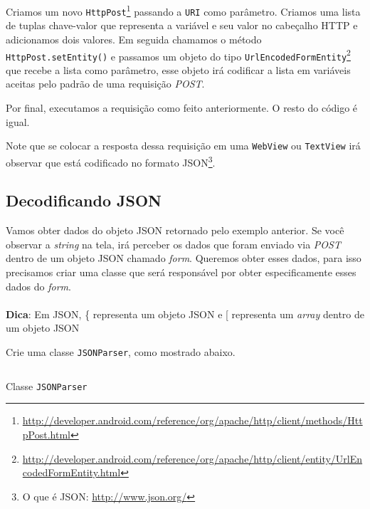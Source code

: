 \documentclass[a4paper,12pt,brazil,oneside]{book}
\begin{document}
		Criamos um novo \texttt{HttpPost}\footnote{\href{http://developer.android.com/reference/org/apache/http/client/methods/HttpPost.html}{http://developer.android.com/reference/org/apache/http/client/methods/HttpPost.html}} passando a \texttt{URI} como parâmetro. Criamos uma lista de tuplas chave-valor que representa a variável e seu valor no cabeçalho HTTP e adicionamos dois valores. Em seguida chamamos o método \texttt{HttpPost.setEntity()} e passamos um objeto do tipo \texttt{UrlEncodedFormEntity}\footnote{\href{http://developer.android.com/reference/org/apache/http/client/entity/UrlEncodedFormEntity.html}{http://developer.android.com/reference/org/apache/http/client/entity/UrlEncodedFormEntity.html}} que recebe a lista como parâmetro, esse objeto irá codificar a lista em variáveis aceitas pelo padrão de uma requisição \emph{POST}.

		Por final, executamos a requisição como feito anteriormente. O resto do código é igual.

 		Note que se colocar a resposta dessa requisição em uma \texttt{WebView} ou \texttt{TextView} irá observar que está codificado no formato JSON\footnote{O que é JSON: \href{http://www.json.org/}{http://www.json.org/}}. 

		\subsection{Decodificando JSON}
		
		Vamos obter dados do objeto JSON retornado pelo exemplo anterior. Se você observar a \emph{string} na tela, irá perceber os dados que foram enviado via \emph{POST} dentro de um objeto JSON chamado \emph{form}. Queremos obter esses dados, para isso precisamos criar uma classe que será responsável por obter especificamente esses dados do \emph{form}.
		
\begin{framed}
\paragraph{}\textbf{Dica}: Em JSON, \{ representa um objeto JSON e [ representa um \emph{array} dentro de um objeto JSON
\textit{}
\end{framed}

		Crie uma classe \texttt{JSONParser}, como mostrado abaixo.
		
		\begin{listing}[H]
		\inputminted[linenos=true,fontsize=\small,frame=lines, framesep=2mm, tabsize=2,numbersep=5pt]{java}{src/api/comm/jsonparser.java}
		\caption{Classe \texttt{JSONParser}}
		\label{code:jsonparser}
		\end{listing} 
\end{document}
